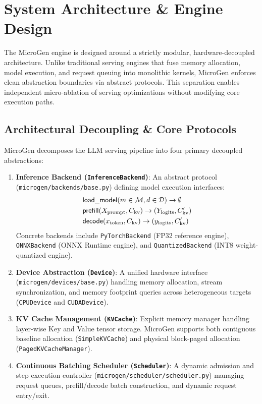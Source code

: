 \section{System Architecture \& Engine Design}
\label{sec:architecture}

The \textsf{MicroGen} engine is designed around a strictly modular, hardware-decoupled architecture. Unlike traditional serving engines that fuse memory allocation, model execution, and request queuing into monolithic kernels, \textsf{MicroGen} enforces clean abstraction boundaries via abstract protocols. This separation enables independent micro-ablation of serving optimizations without modifying core execution paths.

\subsection{Architectural Decoupling \& Core Protocols}
\label{sec:arch_protocols}

\textsf{MicroGen} decomposes the LLM serving pipeline into four primary decoupled abstractions:

\begin{enumerate}
    \item \textbf{Inference Backend (\texttt{InferenceBackend})}: An abstract protocol (\texttt{microgen/backends/base.py}) defining model execution interfaces:
    \begin{align}
        &\text{\textsf{load\_model}}(m \in \mathcal{M}, d \in \mathcal{D}) \rightarrow \emptyset \\
        &\text{\textsf{prefill}}(X_{\text{prompt}}, C_{\text{kv}}) \rightarrow (Y_{\text{logits}}, C_{\text{kv}}') \\
        &\text{\textsf{decode}}(x_{\text{token}}, C_{\text{kv}}) \rightarrow (y_{\text{logits}}, C_{\text{kv}}')
    \end{align}
    Concrete backends include \texttt{PyTorchBackend} (FP32 reference engine), \texttt{ONNXBackend} (ONNX Runtime engine), and \texttt{QuantizedBackend} (INT8 weight-quantized engine).

    \item \textbf{Device Abstraction (\texttt{Device})}: A unified hardware interface (\texttt{microgen/devices/base.py}) handling memory allocation, stream synchronization, and memory footprint queries across heterogeneous targets (\texttt{CPUDevice} and \texttt{CUDADevice}).

    \item \textbf{KV Cache Management (\texttt{KVCache})}: Explicit memory manager handling layer-wise Key and Value tensor storage. \textsf{MicroGen} supports both contiguous baseline allocation (\texttt{SimpleKVCache}) and physical block-paged allocation (\texttt{PagedKVCacheManager}).

    \item \textbf{Continuous Batching Scheduler (\texttt{Scheduler})}: A dynamic admission and step execution controller (\texttt{microgen/scheduler/scheduler.py}) managing request queues, prefill/decode batch construction, and dynamic request entry/exit.
\end{enumerate}

